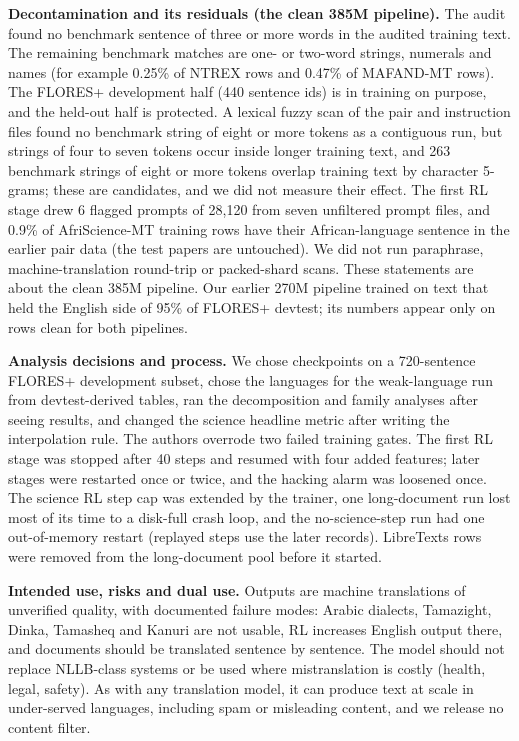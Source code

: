 \textbf{Decontamination and its residuals (the clean 385M pipeline).} The audit found no benchmark sentence of three or more words in the audited training text. The remaining benchmark matches are one- or two-word strings, numerals and names (for example 0.25\% of NTREX rows and 0.47\% of MAFAND-MT rows). The FLORES+ development half (440 sentence ids) is in training on purpose, and the held-out half is protected. A lexical fuzzy scan of the pair and instruction files found no benchmark string of eight or more tokens as a contiguous run, but strings of four to seven tokens occur inside longer training text, and 263 benchmark strings of eight or more tokens overlap training text by character 5-grams; these are candidates, and we did not measure their effect. The first RL stage drew 6 flagged prompts of 28,120 from seven unfiltered prompt files, and 0.9\% of AfriScience-MT training rows have their African-language sentence in the earlier pair data (the test papers are untouched). We did not run paraphrase, machine-translation round-trip or packed-shard scans. These statements are about the clean 385M pipeline. Our earlier 270M pipeline trained on text that held the English side of 95\% of FLORES+ devtest; its numbers appear only on rows clean for both pipelines.

\textbf{Analysis decisions and process.} We chose checkpoints on a 720-sentence FLORES+ development subset, chose the languages for the weak-language run from devtest-derived tables, ran the decomposition and family analyses after seeing results, and changed the science headline metric after writing the interpolation rule. The authors overrode two failed training gates. The first RL stage was stopped after 40 steps and resumed with four added features; later stages were restarted once or twice, and the hacking alarm was loosened once. The science RL step cap was extended by the trainer, one long-document run lost most of its time to a disk-full crash loop, and the no-science-step run had one out-of-memory restart (replayed steps use the later records). LibreTexts rows were removed from the long-document pool before it started.

\textbf{Intended use, risks and dual use.} Outputs are machine translations of unverified quality, with documented failure modes: Arabic dialects, Tamazight, Dinka, Tamasheq and Kanuri are not usable, RL increases English output there, and documents should be translated sentence by sentence. The model should not replace NLLB-class systems or be used where mistranslation is costly (health, legal, safety). As with any translation model, it can produce text at scale in under-served languages, including spam or misleading content, and we release no content filter.
